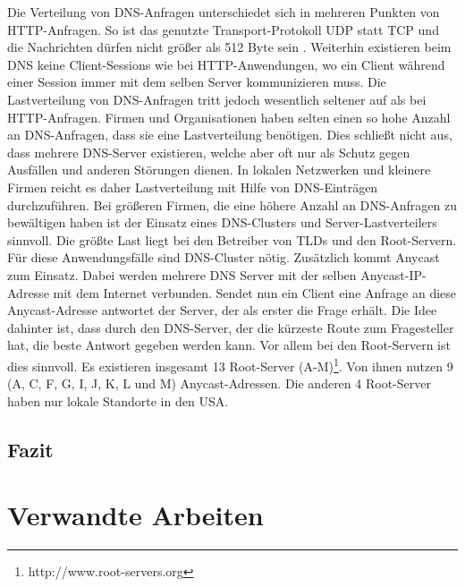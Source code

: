 \documentclass[a4paper, 12pt, BCOR10mm, DIV12, toc=bibliography, toc=listof, german]{scrbook}
\begin{document}
			Die Verteilung von DNS-Anfragen unterschiedet sich in mehreren Punkten von HTTP-Anfragen. So
			ist das genutzte Transport-Protokoll UDP statt TCP und die Nachrichten dürfen nicht größer als
			512 Byte sein \cite{rfc1035}. Weiterhin existieren beim DNS keine Client-Sessions wie bei
			HTTP-Anwendungen, wo ein Client während einer Session immer mit dem selben Server
			kommunizieren muss. Die Lastverteilung von DNS-Anfragen tritt jedoch wesentlich seltener auf
			als bei HTTP-Anfragen. Firmen und Organisationen haben selten einen so hohe Anzahl an
			DNS-Anfragen, dass sie eine Lastverteilung benötigen. Dies schließt nicht aus, dass mehrere
			DNS-Server existieren, welche aber oft nur als Schutz gegen Ausfällen und anderen Störungen
			dienen.  In lokalen Netzwerken und kleinere Firmen reicht es daher Lastverteilung mit Hilfe
			von DNS-Einträgen durchzuführen. Bei größeren Firmen, die eine höhere Anzahl an DNS-Anfragen
			zu bewältigen haben ist der Einsatz eines DNS-Clusters und Server-Lastverteilers sinnvoll. Die
			größte Last liegt bei den Betreiber von TLDs und den Root-Servern. Für diese Anwendungsfälle
			sind DNS-Cluster nötig. Zusätzlich kommt Anycast \cite{rfc4786} zum Einsatz. Dabei werden mehrere DNS Server
			mit der selben Anycast-IP-Adresse mit dem Internet verbunden. Sendet nun ein
			Client eine Anfrage an diese Anycast-Adresse antwortet der Server, der als erster die Frage
			erhält. Die Idee dahinter ist, dass durch den DNS-Server, der die kürzeste Route zum
			Fragesteller hat, die beste Antwort gegeben werden kann. Vor allem bei den Root-Servern ist
			dies sinnvoll. Es existieren insgesamt 13 Root-Server
			(A-M)\footnote{http://www.root-servers.org}. Von ihnen nutzen 9 (A, C, F, G, I, J, K, L und M)
			Anycast-Adressen. Die anderen 4 Root-Server haben nur lokale Standorte in den USA. 
				


		\section{Fazit} %
		\label{sec:grundlagen-fazit}
		


	\chapter{Verwandte Arbeiten} %
	\label{cha:arbeiten}
	
\end{document}
